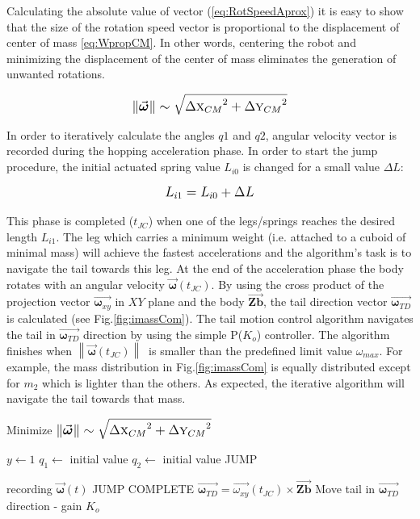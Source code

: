 Calculating the absolute value of vector (\ref{eq:RotSpeedAprox}) it is easy to show that the size of the rotation speed vector is proportional to the displacement of center of mass \eqref{eq:WpropCM}. In other words, centering the robot and minimizing the displacement of the center of mass eliminates the generation of unwanted rotations. 

\begin{equation}\label{eq:WpropCM}
\left \| \vec{\boldsymbol{\omega}} \right \|\sim \sqrt{{\Delta \textsc{x}_{CM}}^2+{\Delta \textsc{y}_{CM}}^2}
\end{equation}


In order to iteratively calculate the angles $q1$ and $q2$, angular velocity vector is recorded during the hopping acceleration phase. In order to start the jump procedure, the initial actuated spring value $L_{i0}$ is changed for a small value $\Delta L$:

\begin{equation}
\tiny
L_{i1}=L_{i0}+\Delta L
\normalsize
\end{equation}  

This phase is completed ($t_{JC}$) when one of the legs/springs reaches the desired length $L_{i1}$. The leg which carries a minimum weight (i.e. attached to a cuboid of minimal mass) will achieve the fastest accelerations and the algorithm’s task is to navigate the tail towards this leg. At the end of the acceleration phase the body rotates with an angular velocity $\vec{\boldsymbol{\omega}}(t_{JC})$. By using the cross product of the projection vector $\vec{\boldsymbol{\omega}_{xy}}$ in $XY$ plane and the body $\vec{\boldsymbol{Zb}}$, the tail direction vector $\vec{\boldsymbol{\omega}_{TD}}$ is calculated (see Fig.\ref{fig:imassCom}). The tail motion control algorithm navigates the tail in $\vec{\boldsymbol{\omega}_{TD}}$ direction by using the simple P($K_o$) controller. The algorithm finishes when $\left \| \vec{\boldsymbol{\omega}}(t_{JC}) \right \|\ $ is smaller than the  predefined limit value $\omega_{max}$.  For example, the mass distribution in Fig.\ref{fig:imassCom} is equally distributed except for $m_2$  which is lighter than the others. As expected, the iterative algorithm will navigate the tail towards that mass.

\begin{algorithm}
\caption{Minimize $\left \| \vec{\boldsymbol{\omega}} \right \|\sim \sqrt{{\Delta \textsc{x}_{CM}}^2+{\Delta \textsc{y}_{CM}}^2}$}
\begin{algorithmic} 
\STATE $y \leftarrow 1$
\REPEAT
\STATE $q_1 \leftarrow$ initial value
\STATE $q_2 \leftarrow$ initial value
\STATE JUMP

\REPEAT
\STATE recording $\vec{\boldsymbol{\omega}}(t)$
\UNTIL JUMP COMPLETE
\STATE $\vec{\boldsymbol{\omega}_{TD}} = \vec{\omega_{xy}}(t_{JC}) \times \vec{\boldsymbol{Zb}}$
\STATE Move tail in $\vec{\boldsymbol{\omega}_{TD}}$ direction - gain $K_o$
\end{algorithmic}
\end{algorithm}


